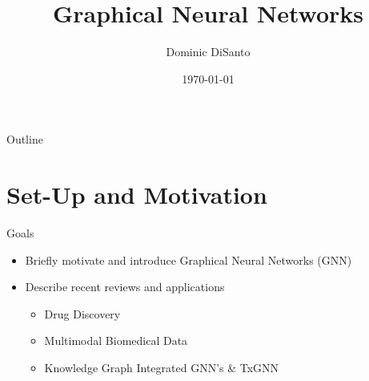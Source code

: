 \documentclass{beamer}
\title{Graphical Neural Networks}
\author{Dominic DiSanto}
\institute[]{Department of Biostatistics, Harvard University}
\date{\today}
\begin{document}
\begin{frame}
\maketitle
\end{frame}

\begin{frame}{Outline}
\tableofcontents 
\end{frame}


\section{Set-Up and Motivation}

\begin{frame}{Goals}
    \begin{itemize}\setlength\itemsep{8mm}
        \item Briefly motivate and introduce Graphical Neural Networks (GNN)
        \item Describe recent reviews and applications 
        \begin{itemize}
            \item Drug Discovery 
            \item Multimodal Biomedical Data 
            \item Knowledge Graph Integrated GNN's \& TxGNN
        \end{itemize}
    \end{itemize}
\end{frame}
\end{document}
